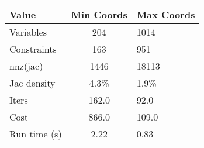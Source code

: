 \begin{tabular}{lcl}
\toprule 
Value & Min Coords & Max Coords \\
\midrule 
Variables & 204 & 1014 \\
Constraints & 163 & 951 \\
nnz(jac) & 1446 & 18113 \\
Jac density & 4.3\% & 1.9\% \\
Iters & 162.0 & 92.0 \\
Cost & 866.0 & 109.0 \\
Run time (s) & 2.22 & 0.83 \\
\bottomrule 
\end{tabular}
